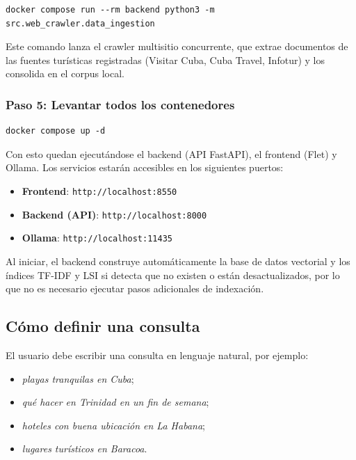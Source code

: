 \documentclass{llncs}
\begin{document}
\begin{verbatim}
docker compose run --rm backend python3 -m src.web_crawler.data_ingestion
\end{verbatim}

Este comando lanza el crawler multisitio concurrente, que extrae documentos de las fuentes turísticas registradas (Visitar Cuba, Cuba Travel, Infotur) y los consolida en el corpus local.

\subsubsection{Paso 5: Levantar todos los contenedores}

\begin{verbatim}
docker compose up -d
\end{verbatim}

Con esto quedan ejecutándose el backend (API FastAPI), el frontend (Flet) y Ollama. Los servicios estarán accesibles en los siguientes puertos:

\begin{itemize}
    \item \textbf{Frontend}: \texttt{http://localhost:8550}
    \item \textbf{Backend (API)}: \texttt{http://localhost:8000}
    \item \textbf{Ollama}: \texttt{http://localhost:11435}
\end{itemize}

Al iniciar, el backend construye automáticamente la base de datos vectorial y los índices TF-IDF y LSI si detecta que no existen o están desactualizados, por lo que no es necesario ejecutar pasos adicionales de indexación.

\subsection{Cómo definir una consulta}

El usuario debe escribir una consulta en lenguaje natural, por ejemplo:

\begin{itemize}
    \item \textit{playas tranquilas en Cuba};
    \item \textit{qué hacer en Trinidad en un fin de semana};
    \item \textit{hoteles con buena ubicación en La Habana};
    \item \textit{lugares turísticos en Baracoa}.
\end{itemize}
\end{document}
